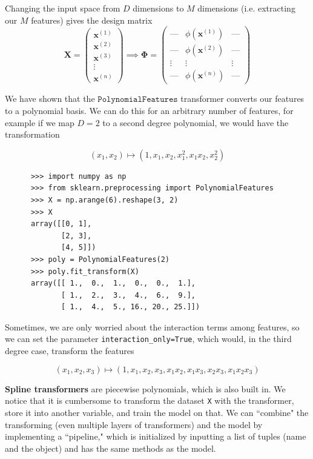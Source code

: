 \documentclass{article}
\begin{document}
      Changing the input space from $D$ dimensions to $M$ dimensions (i.e. extracting our $M$ features) gives the design matrix 
      \begin{equation}
        \mathbf{X} = \begin{pmatrix} 
          \mathbf{x}^{(1)} \\ \mathbf{x}^{(2)} \\ \mathbf{x}^{(3)} \\ \vdots \\ \mathbf{x}^{(n)} \end{pmatrix} \implies \boldsymbol{\Phi} = \begin{pmatrix}
        \text{---} & \phi(\mathbf{x}^{(1)}) & \text{---} \\
        \text{---} & \phi(\mathbf{x}^{(2)}) & \text{---} \\
        \vdots & \vdots & \vdots \\
        \text{---} & \phi(\mathbf{x}^{(n)}) & \text{---}
        \end{pmatrix}
      \end{equation}


      We have shown that the $\texttt{PolynomialFeatures}$ transformer converts our features to a polynomial basis. We can do this for an arbitrary number of features, for example if we map $D = 2$ to a second degree polynomial, we would have the transformation 

      \[(x_1, x_2) \mapsto (1, x_1, x_2, x_1^2, x_1 x_2, x_2^2)\]

      \begin{lstlisting}
      >>> import numpy as np
      >>> from sklearn.preprocessing import PolynomialFeatures
      >>> X = np.arange(6).reshape(3, 2)
      >>> X
      array([[0, 1],
             [2, 3],
             [4, 5]])
      >>> poly = PolynomialFeatures(2)
      >>> poly.fit_transform(X)
      array([[ 1.,  0.,  1.,  0.,  0.,  1.],
             [ 1.,  2.,  3.,  4.,  6.,  9.],
             [ 1.,  4.,  5., 16., 20., 25.]])
      \end{lstlisting}
      Sometimes, we are only worried about the interaction terms among features, so we can set the parameter \texttt{interaction\_only=True}, which would, in the third degree case, transform the features 

        \[(x_1, x_2, x_3) \mapsto (1, x_1, x_2, x_3, x_1 x_2, x_1 x_3, x_2 x_3, x_1 x_2 x_3)\]

      \textbf{Spline transformers} are piecewise polynomials, which is also built in. We notice that it is cumbersome to transform the dataset \texttt{X} with the transformer, store it into another variable, and train the model on that. We can ``combine" the transforming (even multiple layers of transformers) and the model by implementing a ``pipeline," which is initialized by inputting a list of tuples (name and the object) and has the same methods as the model. 
\end{document}
